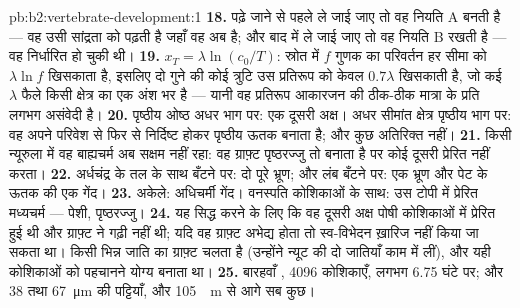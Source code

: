 \begin{solution}{pb:b2:vertebrate-development:1}
\textbf{18.} पढ़े जाने से पहले ले जाई जाए तो वह नियति A बनती है ---
वह उसी सांद्रता को पढ़ती है जहाँ वह अब है; और बाद में ले जाई जाए तो वह
नियति B रखती है --- वह निर्धारित हो चुकी थी।
\textbf{19.} $x_T = \lambda\ln(c_0/T)$: स्रोत में $f$ गुणक का
परिवर्तन हर सीमा को $\lambda\ln f$ खिसकाता है, इसलिए दो गुने की कोई
त्रुटि उस प्रतिरूप को केवल $0.7\lambda$ खिसकाती है, जो कई $\lambda$
फैले किसी क्षेत्र का एक अंश भर है --- यानी वह प्रतिरूप आकारजन की ठीक-ठीक
मात्रा के प्रति लगभग असंवेदी है।
\textbf{20.} पृष्ठीय ओष्ठ अधर भाग पर: एक दूसरी अक्ष। अधर सीमांत
क्षेत्र पृष्ठीय भाग पर: वह अपने परिवेश से फिर से निर्दिष्ट होकर
पृष्ठीय ऊतक बनाता है; और कुछ अतिरिक्त नहीं।
\textbf{21.} किसी न्यूरुला में वह बाह्यचर्म अब सक्षम नहीं रहा: वह
ग्राफ़्ट पृष्ठरज्जु तो बनाता है पर कोई दूसरी  प्रेरित नहीं करता।
\textbf{22.} अर्धचंद्र के तल के साथ बँटने पर: दो पूरे भ्रूण;
और लंब बँटने पर: एक भ्रूण और पेट के ऊतक की एक गेंद।
\textbf{23.} अकेले: अधिचर्मी गेंद। वनस्पति कोशिकाओं के साथ: उस टोपी में
प्रेरित मध्यचर्म --- पेशी, पृष्ठरज्जु।
\textbf{24.} यह सिद्ध करने के लिए कि वह दूसरी अक्ष पोषी कोशिकाओं में
प्रेरित हुई थी और ग्राफ़्ट ने गढ़ी नहीं थी; यदि वह ग्राफ़्ट अभेद्य होता
तो स्व-विभेदन ख़ारिज नहीं किया जा सकता था। किसी भिन्न जाति का ग्राफ़्ट
चलता है (उन्होंने न्यूट की दो जातियाँ काम में लीं), और यही
कोशिकाओं को पहचानने योग्य बनाता था।
\textbf{25.} बारहवाँ , 4096 कोशिकाएँ, लगभग 6.75 घंटे पर; और
38 तथा \qty{67}{\micro m} की पट्टियाँ, और \qty{105}{\micro
m} से आगे सब कुछ।
\end{solution}
